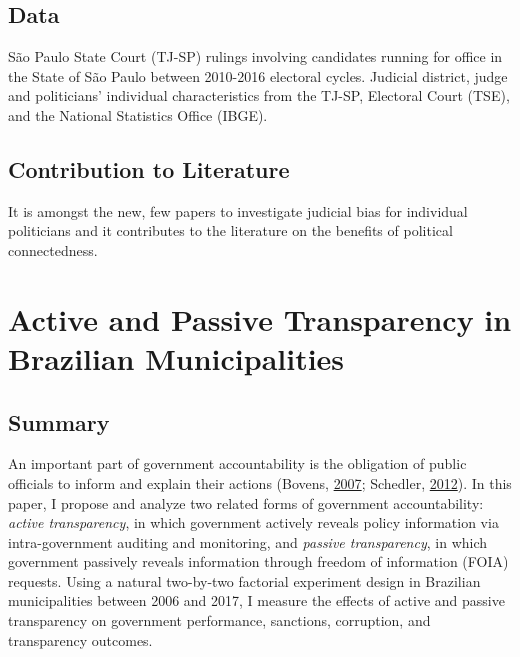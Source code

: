 \documentclass[]{article}
\begin{document}
\hypertarget{data-1}{%
\subsection{Data}\label{data-1}}

São Paulo State Court (TJ-SP) rulings involving candidates running for
office in the State of São Paulo between 2010-2016 electoral cycles.
Judicial district, judge and politicians' individual characteristics
from the TJ-SP, Electoral Court (TSE), and the National Statistics
Office (IBGE).

\hypertarget{contribution-to-literature-1}{%
\subsection{Contribution to
Literature}\label{contribution-to-literature-1}}

It is amongst the new, few papers to investigate judicial bias for
individual politicians and it contributes to the literature on the
benefits of political connectedness.

\hypertarget{title3}{%
\section{Active and Passive Transparency in Brazilian
Municipalities}\label{title3}}

\hypertarget{summary-3}{%
\subsection{Summary}\label{summary-3}}

An important part of government accountability is the obligation of
public officials to inform and explain their actions (Bovens,
\protect\hyperlink{ref-BovensAnalysingAssessingAccountability2007}{2007};
Schedler,
\protect\hyperlink{ref-SchedlerConceptualizingAccountability2012}{2012}).
In this paper, I propose and analyze two related forms of government
accountability: \emph{active transparency}, in which government actively
reveals policy information via intra-government auditing and monitoring,
and \emph{passive transparency}, in which government passively reveals
information through freedom of information (FOIA) requests. Using a
natural two-by-two factorial experiment design in Brazilian
municipalities between 2006 and 2017, I measure the effects of active
and passive transparency on government performance, sanctions,
corruption, and transparency outcomes.
\end{document}
